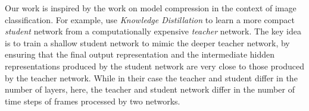 \documentclass[10pt,twocolumn,letterpaper]{article}
\begin{document}
\hspace*{3mm}Our work is inspired by the work on model compression in the context of image classification. For example, \cite{do-deep-really-deep,know-distill,fitnets} use \textit{Knowledge Distillation} to learn a more compact \textit{student} network from a computationally expensive \textit{teacher} network. The key idea is to train a shallow student network to mimic the deeper teacher network, by ensuring that the final output representation and the intermediate hidden representations produced by the student network are very close to those produced by the teacher network. While in their case the teacher and student differ in the number of layers, here, the teacher and student network differ in the number of time steps of frames processed by two networks. %
\end{document}
